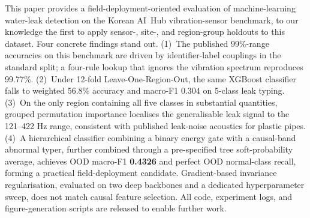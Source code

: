 \documentclass[sensors,article,submit,pdftex,oneauthor]{Definitions/mdpi}
\begin{document}
This paper provides a field-deployment-oriented evaluation
of machine-learning water-leak detection on the Korean AI~Hub
vibration-sensor benchmark, to our knowledge the first to
apply sensor-, site-, and region-group holdouts to this
dataset. Four concrete
findings stand out. (1)~The published 99\%-range accuracies
on this benchmark are driven by identifier-label couplings
in the standard split; a four-rule lookup that ignores the
vibration spectrum reproduces 99.77\%. (2)~Under 12-fold
Leave-One-Region-Out, the same XGBoost classifier falls to
weighted 56.8\% accuracy and macro-F1 0.304 on 5-class leak
typing. (3)~On the only region containing all five classes
in substantial quantities, grouped permutation importance
localises the generalisable leak signal to the
121--422 Hz range, consistent with published leak-noise
acoustics for plastic pipes. (4)~A hierarchical classifier
combining a binary energy gate with a causal-band abnormal
typer, further combined through a pre-specified tree
soft-probability average, achieves OOD macro-F1
\textbf{0.4326} and perfect OOD normal-class recall, forming a
practical field-deployment candidate. Gradient-based invariance regularisation, evaluated
on two deep backbones and a dedicated hyperparameter sweep,
does not match causal feature selection. All code,
experiment logs, and figure-generation scripts are released
to enable further work.

\vspace{6pt}





\end{document}
